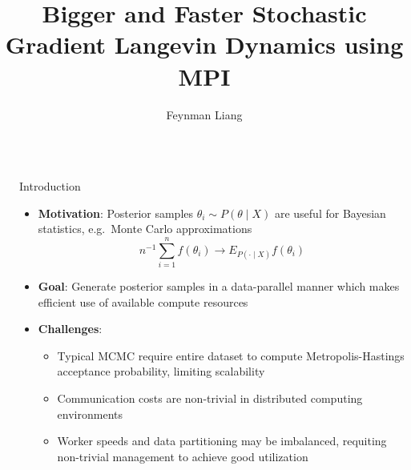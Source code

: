 \documentclass[final]{beamer}
\title{Bigger and Faster Stochastic Gradient Langevin Dynamics using MPI} %
\author{Feynman Liang} %
\institute{CS 267, UC Berkeley} %
\newlength{\sepwid}
\newlength{\onecolwid}
\begin{document}

\setlength{\belowcaptionskip}{2ex} %
\setlength\belowdisplayshortskip{2ex} %

\begin{frame}[t] %

\begin{columns}[t] %

\begin{column}{\sepwid}\end{column} %

\begin{column}{\onecolwid} %



\begin{block}{Introduction}

  \begin{itemize}
    \item \textbf{Motivation}: Posterior samples $\theta_i \sim P(\theta \mid X)$ are useful
      for Bayesian statistics, e.g.\ Monte Carlo approximations
      $$n^{-1} \sum_{i=1}^n f(\theta_i) \to E_{P(\cdot \mid X)} f(\theta_i)$$
    \item \textbf{Goal}: Generate posterior samples in
      a data-parallel manner which makes efficient use of available compute resources
    \item \textbf{Challenges}:
      \begin{itemize}
        \item Typical MCMC require entire dataset
          to compute Metropolis-Hastings acceptance probability, limiting scalability
        \item Communication costs are non-trivial in distributed computing environments
        \item Worker speeds and data partitioning may be imbalanced, requiting non-trivial
          management to achieve good utilization
      \end{itemize}
  \end{itemize}


\end{block}
\end{column}
\end{columns}
\end{frame}
\end{document}
